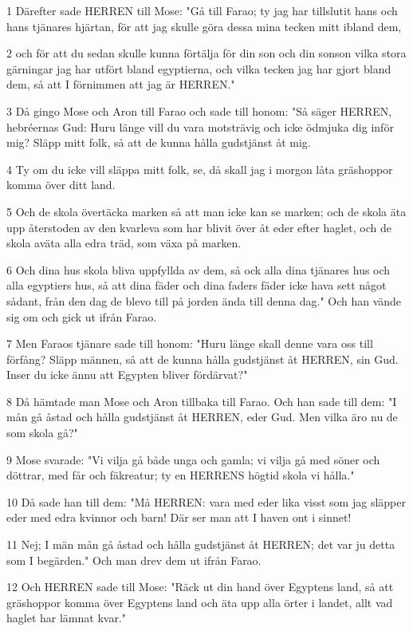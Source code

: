 \par 1 Därefter sade HERREN till Mose: "Gå till Farao; ty jag har tillslutit hans och hans tjänares hjärtan, för att jag skulle göra dessa mina tecken mitt ibland dem,
\par 2 och för att du sedan skulle kunna förtälja för din son och din sonson vilka stora gärningar jag har utfört bland egyptierna, och vilka tecken jag har gjort bland dem, så att I förnimmen att jag är HERREN."
\par 3 Då gingo Mose och Aron till Farao och sade till honom: "Så säger HERREN, hebréernas Gud: Huru länge vill du vara motsträvig och icke ödmjuka dig inför mig? Släpp mitt folk, så att de kunna hålla gudstjänst åt mig.
\par 4 Ty om du icke vill släppa mitt folk, se, då skall jag i morgon låta gräshoppor komma över ditt land.
\par 5 Och de skola övertäcka marken så att man icke kan se marken; och de skola äta upp återstoden av den kvarleva som har blivit över åt eder efter haglet, och de skola aväta alla edra träd, som växa på marken.
\par 6 Och dina hus skola bliva uppfyllda av dem, så ock alla dina tjänares hus och alla egyptiers hus, så att dina fäder och dina faders fäder icke hava sett något sådant, från den dag de blevo till på jorden ända till denna dag." Och han vände sig om och gick ut ifrån Farao.
\par 7 Men Faraos tjänare sade till honom: "Huru länge skall denne vara oss till förfång? Släpp männen, så att de kunna hålla gudstjänst åt HERREN, sin Gud. Inser du icke ännu att Egypten bliver fördärvat?"
\par 8 Då hämtade man Mose och Aron tillbaka till Farao. Och han sade till dem: "I mån gå åstad och hålla gudstjänst åt HERREN, eder Gud. Men vilka äro nu de som skola gå?"
\par 9 Mose svarade: "Vi vilja gå både unga och gamla; vi vilja gå med söner och döttrar, med får och fäkreatur; ty en HERRENS högtid skola vi hålla."
\par 10 Då sade han till dem: "Må HERREN: vara med eder lika visst som jag släpper eder med edra kvinnor och barn! Där ser man att I haven ont i sinnet!
\par 11 Nej; I män mån gå åstad och hålla gudstjänst åt HERREN; det var ju detta som I begärden." Och man drev dem ut ifrån Farao.
\par 12 Och HERREN sade till Mose: "Räck ut din hand över Egyptens land, så att gräshoppor komma över Egyptens land och äta upp alla örter i landet, allt vad haglet har lämnat kvar."
